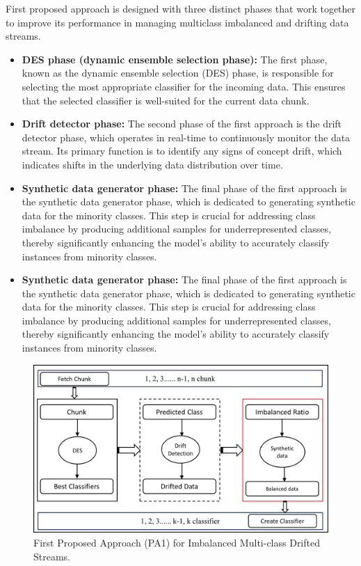 First proposed approach is designed with three distinct phases that work together to improve its performance in managing multiclass imbalanced and drifting data streams. 
\begin{itemize}
	\item \textbf{DES phase (dynamic ensemble selection phase):} The first phase, known as the dynamic ensemble selection (DES) phase, is responsible for selecting the most appropriate classifier for the incoming data. This ensures that the selected classifier is well-suited for the current data chunk.
	\item \textbf{Drift detector phase:} The second phase of the first approach is the drift detector phase, which operates in real-time to continuously monitor the data stream. Its primary function is to identify any signs of concept drift, which indicates shifts in the underlying data distribution over time.
	\item \textbf{Synthetic data generator phase:} The final phase of the first approach is the synthetic data generator phase, which is dedicated to generating synthetic data for the minority classes. This step is crucial for addressing class imbalance by producing additional samples for underrepresented classes, thereby significantly enhancing the model's ability to accurately classify instances from minority classes.
	\item \textbf{Synthetic data generator phase:} The final phase of the first approach is the synthetic data generator phase, which is dedicated to generating synthetic data for the minority classes. This step is crucial for addressing class imbalance by producing additional samples for underrepresented classes, thereby significantly enhancing the model's ability to accurately classify instances from minority classes.
\end{itemize}
\begin{figure}[H]
	\centering
	\includegraphics[width=1\linewidth]{4_Imbalanced/figures/approach_step_1.png}
	\caption{First Proposed Approach (PA1) for Imbalanced Multi-class Drifted Streams.}
	\label{fig:4_first_proposal_step_1}
\end{figure}
